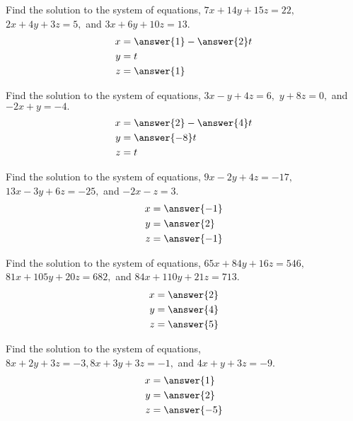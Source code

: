 \documentclass{ximera}
\begin{document}
\begin{problem}\label{prb:2.30} Find the solution to the system of equations, $7x+14y+15z=22,
$ $2x+4y+3z=5,$ and $3x+6y+10z=13.$
 \begin{align*}
 x&=\answer{1}-\answer{2}t\\
 y&=t\\
 z&=\answer{1}\\
 \end{align*}
\end{problem}

\begin{problem}\label{prb:2.31} Find the solution to the system of equations, $3x-y+4z=6,$
$y+8z=0,$ and $-2x+y=-4.$
 \begin{align*}
 x&=\answer{2}-\answer{4}t\\
 y&=\answer{-8}t\\
 z&=t\\
 \end{align*}
\end{problem}

\begin{problem}\label{prb:2.32} Find the solution to the system of equations, $9x-2y+4z=-17,
$ $13x-3y+6z=-25,$ and $-2x-z=3.$
 \begin{align*}
 x&=\answer{-1}\\
 y&=\answer{2}\\
 z&=\answer{-1}\\
 \end{align*}
\end{problem}

\begin{problem}\label{prb:2.33} Find the solution to the system of equations,
$65x+84y+16z=546,$ $81x+105y+20z=682,$ and $84x+110y+21z=713.$
 \begin{align*}
 x&=\answer{2}\\
 y&=\answer{4}\\
 z&=\answer{5}\\
 \end{align*}
\end{problem}

\begin{problem}\label{prb:2.34} Find the solution to the system of equations,
$8x+2y+3z=-3,8x+3y+3z=-1,$ and $4x+y+3z=-9.$
 \begin{align*}
 x&=\answer{1}\\
 y&=\answer{2}\\
 z&=\answer{-5}\\
 \end{align*}
\end{problem}
\end{document}

